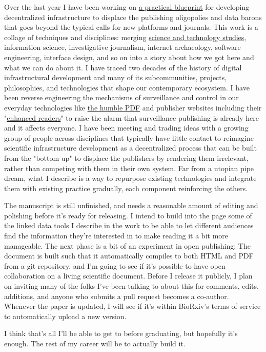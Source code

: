 \begin{done}
Over the last year I have been working on \href{https://jon-e.net/infrastructure/}{a practical blueprint} for developing decentralized infrastructure to displace the publishing oligopolies and data barons that goes beyond the typical calls for new platforms and journals. This work is a collage of techniques and disciplines: merging \href{https://en.wikipedia.org/wiki/Science_and_technology_studies}{science and technology studies}, information science, investigative journalism, internet archaeology, software engineering, interface design, and so on into a story about how we got here and what we can do about it. I have traced two decades of the history of digital infrastructural development and many of its subcommunities, projects, philosophies, and technologies that shape our contemporary ecosystem. I have been reverse engineering the mechanisms of surveillance and control in our everyday technologies like \href{https://twitter.com/json_dirs/status/1486120144141123584}{the humble PDF}\cite{franceschi-bicchieraiAcademicJournalClaims2022} and publisher websites including their "\href{https://twitter.com/json_dirs/status/1466951017459716096}{enhanced readers}"\cite{deferCommentEditeursScientifiques2022} to raise the alarm that surveillance publishing is already here and it affects everyone. I have been meeting and trading ideas with a growing group of people across disciplines that typically have little contact to reimagine scientific infrastructure development as a decentralized process that can be built from the "bottom up" to displace the publishers by rendering them irrelevant, rather than competing with them in their own system. Far from a utopian pipe dream, what I describe is a way to repurpose existing technologies and integrate them with existing practice gradually, each component reinforcing the others. 
\end{done}

\begin{todo}
The manuscript is still unfinished, and needs a reasonable amount of editing and polishing before it's ready for releasing. I intend to build into the page some of the linked data tools I describe in the work to be able to let different audiences find the information they're interested in to make reading it a bit more manageable. The next phase is a bit of an experiment in open publishing: The document is built such that it automatically compiles to both HTML and PDF from a git repository, and I'm going to see if it's possible to have open collaboration on a living scientific document. Before I release it publicly, I plan on inviting many of the folks I've been talking to about this for comments, edits, additions, and anyone who submits a pull request becomes a co-author. Whenever the paper is updated, I will see if it's within BioRxiv's terms of service to automatically upload a new version.
\end{todo}

I think that's all I'll be able to get to before graduating, but hopefully it's enough. The rest of my career will be to actually build it.
